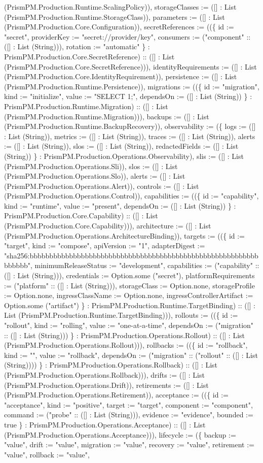 \documentclass[11pt]{article}
\begin{document}
(PrismPM.Production.Runtime.ScalingPolicy)), storageClasses := ([] : List (PrismPM.Production.Runtime.StorageClass)), parameters := ([] : List (PrismPM.Production.Core.Configuration)), secretReferences := ((\{ id := "secret", providerKey := "secret://provider/key", consumers := ("component" :: ([] : List (String))), rotation := "automatic" \} : PrismPM.Production.Core.SecretReference) :: ([] : List (PrismPM.Production.Core.SecretReference))), identityRequirements := ([] : List (PrismPM.Production.Core.IdentityRequirement)), persistence := ([] : List (PrismPM.Production.Runtime.Persistence)), migrations := ((\{ id := "migration", kind := "initialize", value := "SELECT 1;", dependsOn := ([] : List (String)) \} : PrismPM.Production.Runtime.Migration) :: ([] : List (PrismPM.Production.Runtime.Migration))), backups := ([] : List (PrismPM.Production.Runtime.BackupRecovery)), observability := (\{ logs := ([] : List (String)), metrics := ([] : List (String)), traces := ([] : List (String)), alerts := ([] : List (String)), slos := ([] : List (String)), redactedFields := ([] : List (String)) \} : PrismPM.Production.Operations.Observability), slis := ([] : List (PrismPM.Production.Operations.Sli)), slos := ([] : List (PrismPM.Production.Operations.Slo)), alerts := ([] : List (PrismPM.Production.Operations.Alert)), controls := ([] : List (PrismPM.Production.Operations.Control)), capabilities := ((\{ id := "capability", kind := "runtime", value := "present", dependsOn := ([] : List (String)) \} : PrismPM.Production.Core.Capability) :: ([] : List (PrismPM.Production.Core.Capability))), architecture := ([] : List (PrismPM.Production.Operations.ArchitectureBinding)), targets := ((\{ id := "target", kind := "compose", apiVersion := "1", adapterDigest := "sha256:bbbbbbbbbbbbbbbbbbbbbbbbbbbbbbbbbbbbbbbbbbbbbbbbbbbbbbbbbbbbbbbb", minimumReleaseStatus := "development", capabilities := ("capability" :: ([] : List (String))), credentials := Option.some ("secret"), platformRequirements := ("platform" :: ([] : List (String))), storageClass := Option.none, storageProfile := Option.none, ingressClassName := Option.none, ingressControllerArtifact := Option.some ("artifact") \} : PrismPM.Production.Runtime.TargetBinding) :: ([] : List (PrismPM.Production.Runtime.TargetBinding))), rollouts := ((\{ id := "rollout", kind := "rolling", value := "one-at-a-time", dependsOn := ("migration" :: ([] : List (String))) \} : PrismPM.Production.Operations.Rollout) :: ([] : List (PrismPM.Production.Operations.Rollout))), rollbacks := ((\{ id := "rollback", kind := "", value := "rollback", dependsOn := ("migration" :: ("rollout" :: ([] : List (String)))) \} : PrismPM.Production.Operations.Rollback) :: ([] : List (PrismPM.Production.Operations.Rollback))), drifts := ([] : List (PrismPM.Production.Operations.Drift)), retirements := ([] : List (PrismPM.Production.Operations.Retirement)), acceptance := ((\{ id := "acceptance", kind := "positive", target := "target", component := "component", command := ("probe" :: ([] : List (String))), evidence := "evidence", bounded := true \} : PrismPM.Production.Operations.Acceptance) :: ([] : List (PrismPM.Production.Operations.Acceptance))), lifecycle := (\{ backup := "value", drift := "value", migration := "value", recovery := "value", retirement := "value", rollback := "value", 
\end{document}
